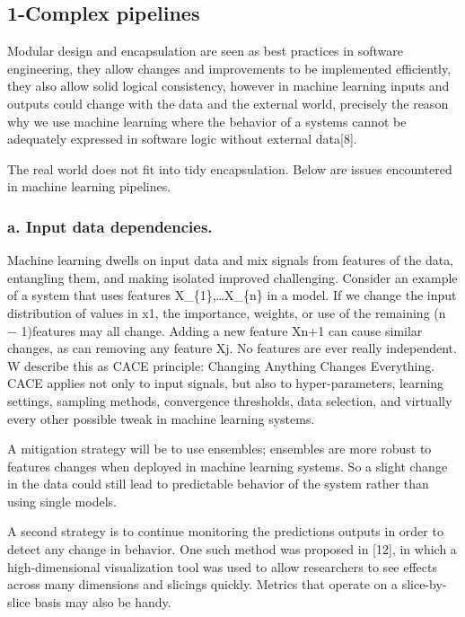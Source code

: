 \documentclass[]{article}
\begin{document}
\subsection{1-Complex pipelines}\label{complex-pipelines}

Modular design and encapsulation are seen as best practices in software
engineering, they allow changes and improvements to be implemented
efficiently, they also allow solid logical consistency, however in
machine learning inputs and outputs could change with the data and the
external world, precisely the reason why we use machine learning where
the behavior of a systems cannot be adequately expressed in software
logic without external data{[}8{]}.

The real world does not fit into tidy encapsulation. Below are issues
encountered in machine learning pipelines.

\subsubsection{a. Input data
dependencies.}\label{a.-input-data-dependencies.}

Machine learning dwells on input data and mix signals from features of
the data, entangling them, and making isolated improved challenging.
Consider an example of a system that uses features
X\_\{1\},\ldots{}X\_\{n\} in a model. If we change the input
distribution of values in x1, the importance, weights, or use of the
remaining (n − 1)features may all change. Adding a new feature Xn+1 can
cause similar changes, as can removing any feature Xj. No features are
ever really independent. W describe this as CACE principle: Changing
Anything Changes Everything. CACE applies not only to input signals, but
also to hyper-parameters, learning settings, sampling methods,
convergence thresholds, data selection, and virtually every other
possible tweak in machine learning systems.

A mitigation strategy will be to use ensembles; ensembles are more
robust to features changes when deployed in machine learning systems. So
a slight change in the data could still lead to predictable behavior of
the system rather than using single models.

A second strategy is to continue monitoring the predictions outputs in
order to detect any change in behavior. One such method was proposed in
{[}12{]}, in which a high-dimensional visualization tool was used to
allow researchers to see effects across many dimensions and slicings
quickly. Metrics that operate on a slice-by-slice basis may also be
handy.
\end{document}
